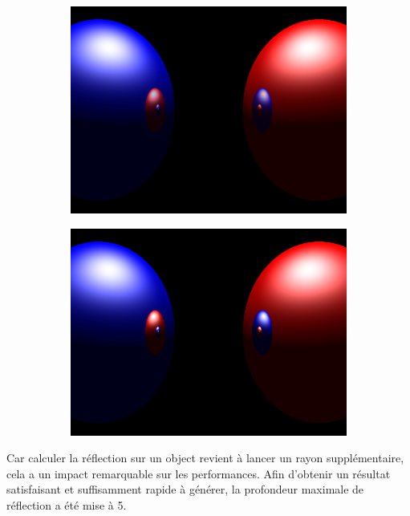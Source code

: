 \documentclass{article}
\begin{document}
\begin{figure}[hb]
  \begin{subfigure}{0.45\textwidth}
    \includegraphics[width=1\textwidth]{images/refl075.png}
  \end{subfigure}
  \begin{subfigure}{0.45\textwidth}
    \includegraphics[width=1\textwidth]{images/refl1.png}
  \end{subfigure}
\end{figure}

Car calculer la réflection sur un object revient à lancer un rayon
supplémentaire, cela a un impact remarquable sur les performances. Afin
d'obtenir un résultat satisfaisant et suffisamment rapide à générer, la
profondeur maximale de réflection a été mise à 5.
\end{document}
